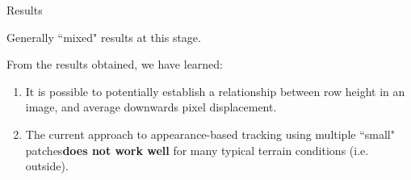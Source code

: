 \documentclass[10pt, compress]{beamer}
\begin{document}

\begin{frame}{Results}

Generally ``mixed" results at this stage. \\ \vspace{0.5cm}

From the results obtained, we have learned:

\begin{enumerate}[label={\arabic*.}]
  \item It is possible to potentially establish a relationship between row height in an image, and average downwards pixel displacement.
  \item The current approach to appearance-based tracking using multiple ``small" patches\textbf{does not work well} for many typical terrain conditions (i.e. outside). 
\end{enumerate}

\end{frame}
\end{document}
